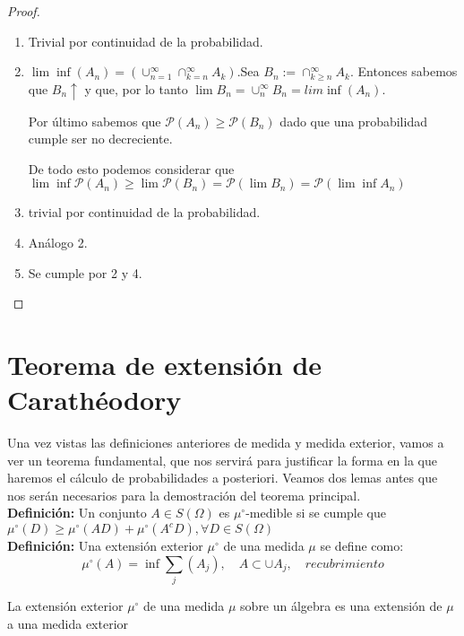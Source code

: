 \begin{proof}
\begin{enumerate} 
  \item Trivial por continuidad de la probabilidad.
  \item $\lim \inf (A_n) = (\cup_{n=1}^\infty\cap_{k=n}^\infty A_k)$.Sea $B_n := \cap_{k\geq n}^\infty A_k$. Entonces sabemos que $B_n \uparrow$ y que, por lo tanto $\lim B_n = \cup_n^\infty B_n = lim \inf (A_n)$. 
  
  Por último sabemos que $\mathcal{P}(A_n) \geq \mathcal{P}(B_n)$ dado que una probabilidad cumple ser  no decreciente.
  
  De todo esto podemos considerar que $\lim \inf \mathcal{P}(A_n) \geq \lim \mathcal{P}(B_n) = \mathcal{P}(\lim B_n) = \mathcal{P}(\lim \inf A_n)$
  
  \item trivial por continuidad de la probabilidad.
  
  \item Análogo 2.
  
  \item Se cumple por 2  y 4.
\end{enumerate}
\end{proof}

\section{Teorema de extensión de Carathéodory}

Una vez vistas las definiciones anteriores de medida y medida exterior, vamos a ver un teorema fundamental, que nos servirá para justificar la forma en la que haremos el cálculo de probabilidades a posteriori. Veamos dos lemas antes que nos serán necesarios para la demostración del teorema principal.\\

\textbf{Definición:} Un conjunto $A\in S(\Omega)$ es $\mu^\circ$-medible si se cumple que $\mu^\circ(D) \geq \mu^\circ(AD)+\mu^\circ(A^cD), \forall D \in S(\Omega)$\\

\textbf{Definición:} Una extensión exterior $\mu^\circ$ de una medida $\mu$ se define como:
$$\mu^\circ (A) = \inf \sum_j (A_j), \quad A \subset \cup A_j,\quad recubrimiento $$

\begin{theorem}
La extensión exterior $\mu^\circ$ de una medida $\mu$ sobre un álgebra es una extensión de $\mu$ a una medida exterior
\end{theorem}

